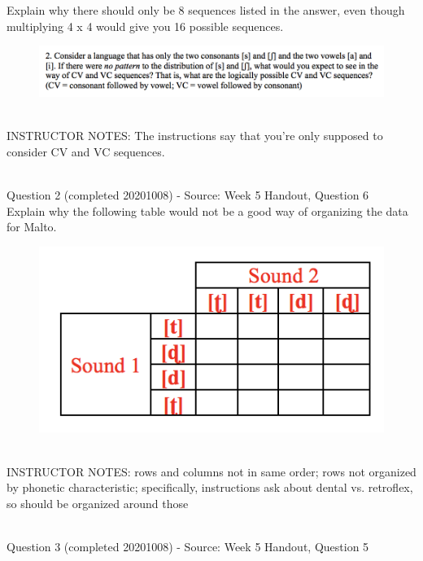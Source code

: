 \documentclass[12pt]{article}
\begin{document}
Explain why there should only be 8 sequences listed in the answer, even though multiplying 4 x 4 would give you 16 possible sequences.\\

\begin{figure}[H]
\includegraphics{../images/skew2.png}
\end{figure}

~\\
INSTRUCTOR NOTES: The instructions say that you're only supposed to consider CV and VC sequences. 


~\\

{\large Question 2} (completed 20201008) - Source: Week 5 Handout, Question 6\\

Explain why the following table would not be a good way of organizing the data for Malto.\\

\begin{figure}[H]
\includegraphics{../images/Malto_table_bad.png}
\end{figure}

~\\
INSTRUCTOR NOTES: rows and columns not in same order; rows not organized by phonetic characteristic; specifically, instructions ask about dental vs. retroflex, so should be organized around those


~\\

{\large Question 3} (completed 20201008) - Source: Week 5 Handout, Question 5\\
\end{document}

